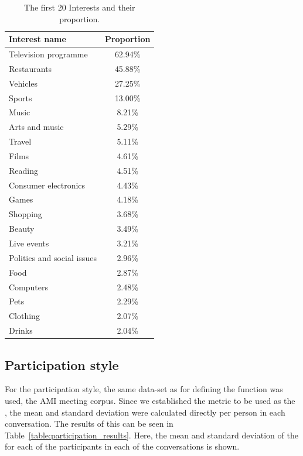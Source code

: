 \begin{table}[H]
    \centering
    \begin{tabular}{lc}
    \hline
    Interest name              & Proportion \\
    \hline
    Television programme       & 62.94\%    \\
    Restaurants                & 45.88\%    \\
    Vehicles                   & 27.25\%    \\
    Sports                     & 13.00\%    \\
    Music                      & 8.21\%     \\
    Arts and music             & 5.29\%     \\
    Travel                     & 5.11\%     \\
    Films                      & 4.61\%     \\
    Reading                    & 4.51\%     \\
    Consumer electronics       & 4.43\%     \\
    Games                      & 4.18\%     \\
    Shopping                   & 3.68\%     \\
    Beauty                     & 3.49\%     \\
    Live events                & 3.21\%     \\
    Politics and social issues & 2.96\%     \\
    Food                       & 2.87\%     \\
    Computers                  & 2.48\%     \\
    Pets                       & 2.29\%     \\
    Clothing                   & 2.07\%     \\
    Drinks                     & 2.04\%     \\
    \hline
    \end{tabular}
    \caption{The first 20 Interests and their proportion.}
    \label{table:results_interests}
\end{table}

\subsection{Participation style}

For the participation style, the same data-set as for defining the function was used, the AMI meeting corpus. Since we established the metric to be used as the , the mean and standard deviation were calculated directly per person in each conversation. The results of this can be seen in Table~\ref{table:participation_results}. Here, the mean and standard deviation of the  for each of the participants in each of the conversations is shown.\\

